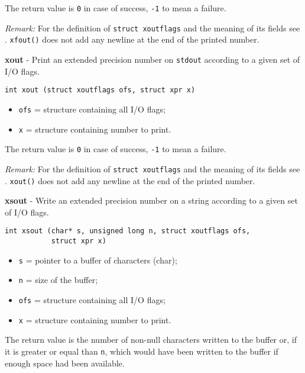\documentclass{article}
\begin{document}
The return value is \texttt{0} in case of success, 
\texttt{-1} to mean a failure.

\textit{Remark:} 
For the definition of \texttt{struct xoutflags} and the meaning 
of its fields see . 
\texttt{xfout()} does not add any newline 
at the end of the printed number.


\hrulefill{}

\textbf{xout} - Print an extended precision number on \texttt{stdout} according to
a given set of I/O flags.

\begin{verbatim}
int xout (struct xoutflags ofs, struct xpr x)
\end{verbatim}

\begin{itemize}
\item \texttt{ofs} = structure containing all I/O flags;
\item \texttt{x}   = structure containing number to print.
\end{itemize}

The return value is \texttt{0} in case of success, \texttt{-1} to mean a failure.

\textit{Remark:} 
For the definition of \texttt{struct xoutflags} and the meaning 
of its fields see . 
\texttt{xout()} does not add any newline 
at the end of the printed number.


\hrulefill{}

\textbf{xsout} - Write an extended precision number on a string according to
a given set of I/O flags.

\begin{verbatim}
int xsout (char* s, unsigned long n, struct xoutflags ofs,
           struct xpr x)
\end{verbatim}

\begin{itemize}
\item \texttt{s}   = pointer to a buffer of characters (char);
\item \texttt{n}   = size of the buffer;
\item \texttt{ofs} = structure containing all I/O flags;
\item \texttt{x}   = structure containing number to print.
\end{itemize}

The return value is the number of non-null characters written
to the buffer or, if it is greater or equal than \texttt{n}, which would have been 
written to the buffer if enough space had been available.
\end{document}
